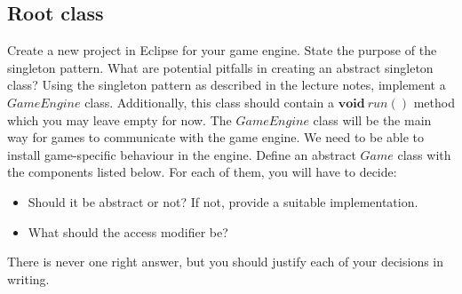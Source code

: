 \documentclass[10pt,a4paper,fleqn]{exam}
\begin{document}
\begin{questions}
\section{Root class}

\question Create a new project in Eclipse for your game engine.
\question State the purpose of the singleton pattern.
\question What are potential pitfalls in creating an abstract singleton class?
\question Using the singleton pattern as described in the lecture notes, implement a $\mathit{GameEngine}$ class. Additionally, this class should contain a $\mathbf{void}~\mathit{run}()$ method which you may leave empty for now.
\question The $\mathit{GameEngine}$ class will be the main way for games to communicate with the game engine. We need to be able to install game-specific behaviour in the engine. Define an abstract $\mathit{Game}$ class with the components listed below. For each of them, you will have to decide: 
\begin{itemize}
\item Should it be abstract or not? If not, provide a suitable implementation.
\item What should the access modifier be?
\end{itemize}
There is never one right answer, but you should justify each of your decisions in writing.
\end{questions}
\end{document}
